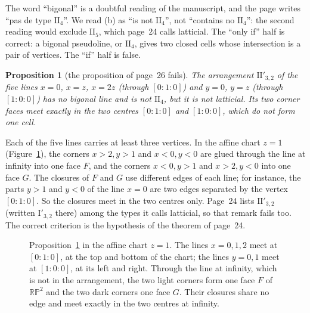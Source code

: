 \documentclass[11pt,a4paper]{amsart}
\newtheorem{proposition}[theorem]{Proposition}
\theoremstyle{definition}
\theoremstyle{remark}
\newcommand{\II}[1]{\mathrm{II}_{#1}}
\newcommand{\IIp}{\mathrm{II}'_{3,2}}
\newcommand{\PP}{\mathbb{RP}^2}
\begin{document}
The word ``bigonal'' is a doubtful reading of the manuscript, and the page writes ``pas de type $\II4$''. We read (b) as ``is not $\II4$'', not ``contains no $\II4$'': the second reading would exclude $\II5$, which page~24 calls latticial. The ``only if'' half is correct: a bigonal pseudoline, or $\II4$, gives two closed cells whose intersection is a pair of vertices. The ``if'' half is false.

\begin{proposition}[the proposition of page~26 fails]\label{prop:false}
The arrangement $\IIp$ of the five lines $x = 0$, $x = z$, $x = 2z$ (through $[0:1:0]$) and $y = 0$, $y = z$ (through $[1:0:0]$) has no bigonal line and is not $\II4$, but it is not latticial. Its two corner faces meet exactly in the two centres $[0:1:0]$ and $[1:0:0]$, which do not form one cell.
\end{proposition}

Each of the five lines carries at least three vertices. In the affine chart $z = 1$ (Figure~\ref{fig:corner}), the corners $x > 2, y > 1$ and $x < 0, y < 0$ are glued through the line at infinity into one face $F$, and the corners $x < 0, y > 1$ and $x > 2, y < 0$ into one face $G$. The closures of $F$ and $G$ use different edges of each line; for instance, the parts $y > 1$ and $y < 0$ of the line $x = 0$ are two edges separated by the vertex $[0:1:0]$. So the closures meet in the two centres only. Page~24 lists $\IIp$ (written $\mathrm I'_{3,2}$ there) among the types it calls latticial, so that remark fails too. The correct criterion is the hypothesis of the theorem of page~24.

\begin{figure}[ht]
\centering
{}
\caption{Proposition~\ref{prop:false} in the affine chart $z = 1$. The lines $x = 0, 1, 2$ meet at $[0:1:0]$, at the top and bottom of the chart; the lines $y = 0, 1$ meet at $[1:0:0]$, at its left and right. Through the line at infinity, which is not in the arrangement, the two light corners form one face $F$ of $\PP$ and the two dark corners one face $G$. Their closures share no edge and meet exactly in the two centres at infinity.}\label{fig:corner}
\end{figure}
\end{document}
